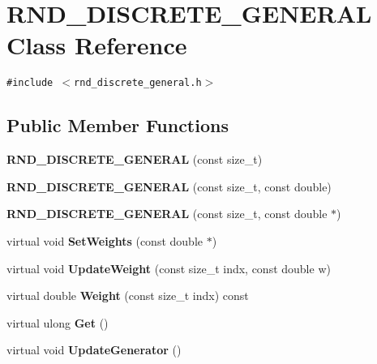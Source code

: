 \section{RND\_\-DISCRETE\_\-GENERAL Class Reference}
\label{classRND__DISCRETE__GENERAL}
{\tt \#include $<$rnd\_\-discrete\_\-general.h$>$}

\subsection*{Public Member Functions}
\begin{CompactItemize}
\item 
\textbf{RND\_\-DISCRETE\_\-GENERAL} (const size\_\-t)\label{classRND__DISCRETE__GENERAL_708ec640239e697b3e51ba2d0a5b78d5}

\item 
\textbf{RND\_\-DISCRETE\_\-GENERAL} (const size\_\-t, const double)\label{classRND__DISCRETE__GENERAL_681bd3b20cf2cdca91dbce8545d29a17}

\item 
\textbf{RND\_\-DISCRETE\_\-GENERAL} (const size\_\-t, const double $\ast$)\label{classRND__DISCRETE__GENERAL_73d0c3ca08021673231629b42fb8e67c}

\item 
virtual void \textbf{SetWeights} (const double $\ast$)\label{classRND__DISCRETE__GENERAL_f5f256b572a33b2be85d82a5a0ec09c0}

\item 
virtual void \textbf{UpdateWeight} (const size\_\-t indx, const double w)\label{classRND__DISCRETE__GENERAL_504bd9014e4ca541b061d7397f4cb738}

\item 
virtual double \textbf{Weight} (const size\_\-t indx) const \label{classRND__DISCRETE__GENERAL_84771904f4d7f66f55738823178fa31f}

\item 
virtual ulong \textbf{Get} ()\label{classRND__DISCRETE__GENERAL_52bd222c798b062ed3970d5b676e8ed2}

\item 
virtual void \textbf{UpdateGenerator} ()\label{classRND__DISCRETE__GENERAL_8c403bb39a5f2a268b503435dcc7d358}

\end{CompactItemize}
